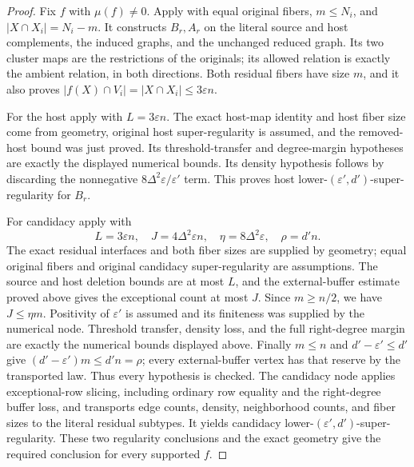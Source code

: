 \begin{proof}
Fix $f$ with $\mu(f)\ne0$. Apply 
with equal original fibers, $m\leq N_i$, and $|X\cap X_i|=N_i-m$.
It constructs $B_r,A_r$ on the literal source and host complements,
the induced graphs, and the unchanged reduced graph. Its two cluster
maps are the restrictions of the originals; its allowed relation is
exactly the ambient  relation, in both directions.
Both residual fibers have size $m$, and it also proves
$|f(X)\cap V_i|=|X\cap X_i|\leq3\varepsilon n$.

For the host apply  with
$L=3\varepsilon n$. The exact host-map identity and host fiber size
come from geometry, original host super-regularity is assumed, and
the removed-host bound was just proved. Its threshold-transfer
and degree-margin hypotheses are exactly the displayed numerical
bounds. Its density hypothesis follows by discarding the nonnegative
$8\Delta^2\varepsilon/\varepsilon'$ term. This proves
host lower-$(\varepsilon',d')$-super-regularity for $B_r$.

For candidacy apply  with
\[
 L=3\varepsilon n,\quad J=4\Delta^2\varepsilon n,\quad
 \eta=8\Delta^2\varepsilon,\quad \rho=d'n.
\]
The exact residual interfaces and both fiber sizes are supplied by
geometry; equal original fibers and original candidacy super-regularity
are assumptions. The source and host deletion bounds are at most $L$,
and the external-buffer estimate proved above gives the exceptional count at most $J$.
Since $m\geq n/2$, we have $J\leq\eta m$.
Positivity of $\varepsilon'$ is assumed and its finiteness was supplied
by the numerical node. Threshold transfer, density loss, and the full
right-degree margin are exactly the numerical bounds displayed above.
Finally $m\leq n$ and $d'-\varepsilon'\leq d'$ give
$(d'-\varepsilon')m\leq d'n=\rho$; every external-buffer vertex has
that reserve by the transported law. Thus every hypothesis is checked.
The candidacy node applies exceptional-row slicing, including ordinary
row equality and the right-degree buffer loss, and transports edge
counts, density, neighborhood counts, and fiber sizes to the literal
residual subtypes. It yields candidacy
lower-$(\varepsilon',d')$-super-regularity. These two regularity
conclusions and the exact geometry give the required conclusion
for every supported $f$.
\end{proof}
